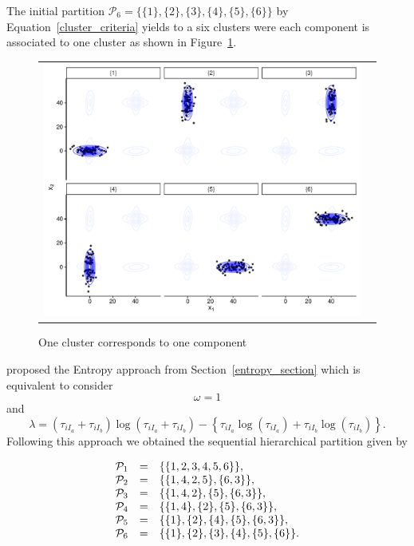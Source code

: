 \documentclass[10pt, a4paper]{article}
\theoremstyle{definition}
\begin{document}
\begin{spacing}{1.9}
The initial partition  $\mathcal{P}_6 = \{ \{1\},\{2\}, \{3\}, \{4\}, \{5\}, \{6\} \}$  by Equation~\ref{cluster_criteria} yields to a six clusters were each component is associated to one cluster as shown in Figure~\ref{ex_one_one}.

\begin{figure}[h]
\begin{center}
\begin{tabular}{cc}
  \includegraphics[width=\textwidth]{figures/partition-example-part6.pdf} \\
 \end{tabular}
 \caption{One cluster corresponds to one component}\label{ex_one_one}
\end{center}
\end{figure}

 \cite{baudry2010combining} proposed the Entropy approach from Section~\ref{entropy_section} which is equivalent to consider \[\omega = 1\] and \[\lambda = (\tau_{iI_a}+\tau_{iI_b}) \log(\tau_{iI_a} + \tau_{iI_b}) - \left\{ \tau_{iI_a} \log(\tau_{iI_a}) + \tau_{iI_b} \log(\tau_{iI_b}) \right\}.\] Following this approach we obtained the sequential hierarchical partition given by 

\begin{equation}
\begin{array}{r c l}
\mathcal{P}_1 &=& \{\{1, 2, 3, 4, 5, 6\}\}, \\
\mathcal{P}_2 &=& \{\{1, 4, 2, 5\}, \{6, 3\} \},  \\
\mathcal{P}_3 &=& \{\{1, 4, 2\}, \{5\}, \{6, 3\} \}, \\
\mathcal{P}_4 &=& \{\{1, 4\},\{2\}, \{5\}, \{6, 3\} \}, \\
\mathcal{P}_5 &=& \{\{1\},\{2\},\{4\},\{5\},\{6,3\} \},\\
\mathcal{P}_6 &=& \{\{1\},\{2\},\{3\},\{4\},\{5\},\{6\}\}.
\end{array}
\label{hier_ex}
\end{equation}


\end{spacing}
\end{document}
